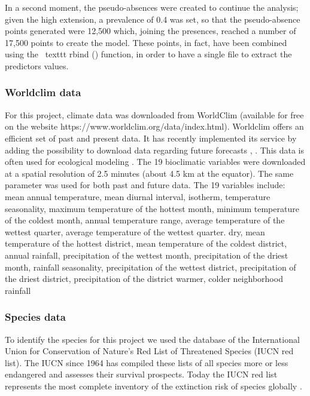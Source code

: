 \documentclass[12pt,a4paper]{article}
\begin{document}
In a second moment, the pseudo-absences were created to continue the analysis; given the high extension, a prevalence of 0.4 was set, so that the pseudo-absence points generated were 12,500 which, joining the presences, reached a number of 17,500 points to create the model.
These points, in fact, have been combined using the \ texttt {rbind ()} function, in order to have a single file to extract the predictors values.
\subsubsection{Worldclim data}
For this project, climate data was downloaded from WorldClim (available for free on the website https://www.worldclim.org/data/index.html).
Worldclim offers an efficient set of past and present data. It has recently implemented its service by adding the possibility to download data regarding future forecasts \citep{wc}, \citep{ey}. This data is often used for ecological modeling \citep{bcw}. 
The 19 bioclimatic variables were downloaded at a spatial resolution of 2.5 minutes (about 4.5 km at the equator). The same parameter was used for both past and future data.
The 19 variables include: mean annual temperature, mean diurnal interval, isotherm, temperature seasonality, maximum temperature of the hottest month, minimum temperature of the coldest month, annual temperature range, average temperature of the wettest quarter, average temperature of the wettest quarter. dry, mean temperature of the hottest district, mean temperature of the coldest district, annual rainfall, precipitation of the wettest month, precipitation of the driest month, rainfall seasonality, precipitation of the wettest district, precipitation of the driest district, precipitation of the district warmer, colder neighborhood rainfall 
\subsubsection{Species data}
To identify the species for this project we used the database of the International Union for Conservation of Nature's Red List of Threatened Species (IUCN red list).
The IUCN since 1964 has compiled these lists of all species more or less endangered and assesses their survival prospects. Today the IUCN red list represents the most complete inventory of the extinction risk of species globally \citep {IUCN}.
\end{document}
